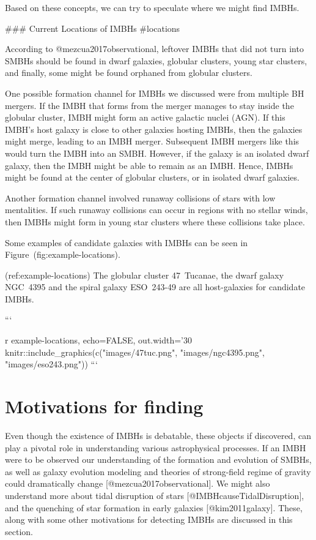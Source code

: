 {{{Based on these concepts, we can try to speculate where we might find
IMBHs.


### Current Locations of IMBHs {#locations}

According to @mezcua2017observational, leftover IMBHs that did not turn
into SMBHs should be found in dwarf galaxies, globular clusters, young
star clusters, and finally, some might be found orphaned from globular
clusters.

One possible formation channel for IMBHs we discussed were from multiple
BH mergers. If the IMBH that forms from the merger manages to stay
inside the globular cluster, IMBH might form an active galactic nuclei
(AGN). If this IMBH's host galaxy is close to other galaxies hosting
IMBHs, then the galaxies might merge, leading to an IMBH merger.
Subsequent IMBH mergers like this would turn the IMBH into an SMBH.
However, if the galaxy is an isolated dwarf galaxy, then the IMBH might
be able to remain as an IMBH. Hence, IMBHs might be found at the center
of globular clusters, or in isolated dwarf galaxies.

Another formation channel involved runaway collisions of stars with low
mentalities. If such runaway collisions can occur in regions with no
stellar winds, then IMBHs might form in young star clusters where these
collisions take place.

Some examples of candidate galaxies with IMBHs can be seen in
Figure~\@ref(fig:example-locations).

(ref:example-locations) The globular cluster 47~Tucanae, the dwarf galaxy NGC~4395 and the spiral galaxy ESO~243-49 are all host-galaxies for candidate IMBHs.

```{r example-locations, echo=FALSE, out.width='30%
knitr::include_graphics(c("images/47tuc.png", "images/ngc4395.png", "images/eso243.png"))
```



\section{Motivations for finding}

Even though the existence of IMBHs is debatable, these objects if
discovered, can play a pivotal role in understanding various
astrophysical processes. If an IMBH were to be observed our
understanding of the formation and evolution of SMBHs, as well as galaxy
evolution modeling and theories of strong-field regime of gravity could
dramatically change [@mezcua2017observational]. We might also understand
more about tidal disruption of stars [@IMBHcauseTidalDisruption], and
the quenching of star formation in early galaxies [@kim2011galaxy].
These, along with some other motivations for detecting IMBHs are
discussed in this section.


}}}}
